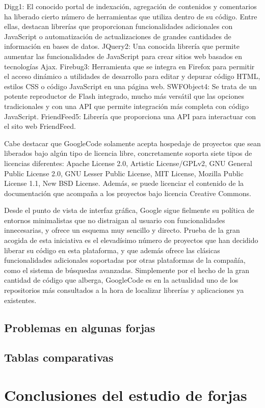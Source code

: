 Digg1: El conocido portal de indexación, agregación de contenidos y comentarios
 ha liberado cierto número de herramientas que utiliza dentro de su código. Entre
  ellas, destacan librerías que proporcionan funcionalidades adicionales con
  JavaScript o automatización de actualizaciones de grandes cantidades de
  información en bases de datos.
JQuery2: Una conocida librería que permite aumentar las funcionalidades de
    JavaScript para crear sitios web basados en tecnologías Ajax.
Firebug3: Herramienta que se integra en Firefox para permitir el acceso dinámico a
    utilidades de desarrollo para editar y depurar código HTML, estilos CSS o código
     JavaScript en una página web.
SWFObject4: Se trata de un potente reproductor de Flash integrado, mucho más
    versátil que las opciones tradicionales y con una API que permite integración más
      completa con código JavaScript.
FriendFeed5: Librería que proporciona una API para interactuar con el sito web
    FriendFeed.

Cabe destacar que GoogleCode solamente acepta hospedaje de proyectos que sean
liberados bajo algún tipo de licencia libre, concretamente soporta siete tipos de licencias
diferentes: Apache License 2.0, Artistic License/GPLv2, GNU General Public License 2.0, GNU Lesser Public License, MIT License, Mozilla Public License 1.1, New BSD License.
Además, se puede licenciar el contenido de la documentación que acompaña a los
proyectos bajo licencia Creative Commons.

Desde el punto de vista de interfaz gráfica, Google sigue fielmente su política de entornos
minimalistas que no distraigan al usuario con funcionalidades innecesarias, y ofrece un
esquema muy sencillo y directo. Prueba de la gran acogida de esta iniciativa es el
elevadísimo número de proyectos que han decidido liberar su código en esta plataforma, y
que además ofrece las clásicas funcionalidades adicionales soportadas por otras
plataformas de la compañía, como el sistema de búsquedas avanzadas. Simplemente por
el hecho de la gran cantidad de código que alberga, GoogleCode es en la actualidad uno
de los repositorios más consultados a la hora de localizar librerías y aplicaciones ya
existentes.


\subsection{Problemas en algunas forjas}
\label{sub:problemas}


\subsection{Tablas comparativas}
\label{sub:comparativa}


\section{Conclusiones del estudio de forjas}
\label{sec:conclusiones}

